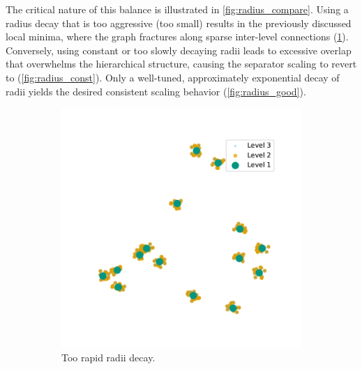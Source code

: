 The critical nature of this balance is illustrated in \cref{fig:radius_compare}.
Using a radius decay that is too aggressive (too small) results in the previously discussed local minima, where the graph fractures along sparse inter-level connections (\cref{fig:radius_small}).
Conversely, using constant or too slowly decaying radii leads to excessive overlap that overwhelms the hierarchical structure, causing the separator scaling to revert to  (\cref{fig:radius_const}).
Only a well-tuned, approximately exponential decay of radii yields the desired consistent scaling behavior (\cref{fig:radius_good}).

\begin{figure}[tbhp]
	\begin{subfigure}{0.3\linewidth}
		\centering
		\includegraphics[width=\linewidth]{graphics/small.pdf}
		\caption{Too rapid radii decay.}
		\label{fig:radius_small}
	\end{subfigure}
	\hfill
	\begin{subfigure}{0.3\linewidth}
		\centering

\end{subfigure}
\end{figure}
